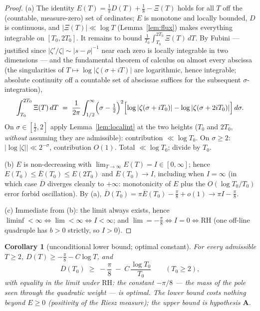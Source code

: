 \documentclass[11pt]{amsart}
\theoremstyle{plain}
\newtheorem{corollary}[theorem]{Corollary}
\theoremstyle{definition}
\theoremstyle{remark}
\newcommand{\RH}{\mathrm{RH}}
\newcommand{\Aax}{\mathbf{A}}
\begin{document}
\begin{proof}
(a) The identity $E(T)=\frac1\pi D(T)+\frac18-\Xi(T)$ holds for all $T$ off the (countable, measure-zero) set of ordinates; $E$ is monotone and locally bounded, $D$ is continuous, and $|\Xi(T)|\ll\log T$ (Lemma~\ref{lem:flux}) makes everything integrable on $[T_0,2T_0]$. It remains to bound $\frac1{T_0}\int_{T_0}^{2T_0}\Xi(T)\,dT$. By Fubini --- justified since $|\zeta'/\zeta|\sim|s-\rho|^{-1}$ near each zero is locally integrable in two dimensions --- and the fundamental theorem of calculus on almost every abscissa (the singularities of $T\mapsto\log|\zeta(\sigma+iT)|$ are logarithmic, hence integrable; absolute continuity off a countable set of abscissae suffices for the subsequent $\sigma$-integration),
\[
\int_{T_0}^{2T_0}\Xi(T)\,dT
\;=\;\frac1{2\pi}\int_{1/2}^\infty\Bigl(\sigma-\tfrac12\Bigr)^2\Bigl[\log|\zeta(\sigma+iT_0)|-\log|\zeta(\sigma+2iT_0)|\Bigr]\,d\sigma .
\]
On $\sigma\in[\tfrac12,2]$ apply Lemma~\ref{lem:localint} at the two heights ($T_0$ and $2T_0$, \emph{without} assuming they are admissible): contribution $\ll\log T_0$. On $\sigma\ge2$: $|\log|\zeta||\ll2^{-\sigma}$, contribution $O(1)$. Total $\ll\log T_0$; divide by $T_0$.

(b) $E$ is non-decreasing with $\lim_{T\to\infty}E(T)=I\in[0,\infty]$; hence $E(T_0)\le\overline E(T_0)\le E(2T_0)$ and $\overline E(T_0)\to I$, including when $I=\infty$ (in which case $\overline D$ diverges cleanly to $+\infty$: monotonicity of $E$ plus the $O(\log T_0/T_0)$ error forbid oscillation). By (a), $\overline D(T_0)=\pi\overline E(T_0)-\frac\pi8+o(1)\to\pi I-\frac\pi8$.

(c) Immediate from (b): the limit always exists, hence $\liminf<\infty\iff\lim<\infty\iff I<\infty$; and $\lim=-\frac\pi8\iff I=0\iff\RH$ (one off-line quadruple has $b>0$ strictly, so $I>0$).
\end{proof}

\begin{corollary}[unconditional lower bound; optimal constant]\label{cor:lower}
For every admissible $T\ge2$, $D(T)\ge-\frac\pi8-C\log T$, and
\[
\overline D(T_0)\;\ge\;-\frac\pi8\;-\;C\,\frac{\log T_0}{T_0}\qquad(T_0\ge2),
\]
with equality in the limit under $\RH$: the constant $-\pi/8$ --- the mass of the pole seen through the quadratic weight --- is optimal. The lower bound costs nothing beyond $E\ge0$ (positivity of the Riesz measure); \emph{the upper bound is hypothesis $\Aax$}.
\end{corollary}
\end{document}
